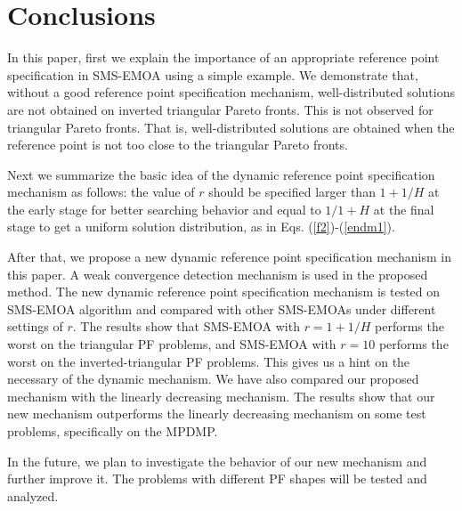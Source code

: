 \documentclass[conference]{IEEEtran}
\begin{document}
\section{Conclusions}

In this paper, first we explain the importance of an appropriate reference point specification 
in SMS-EMOA using a simple example. 
We demonstrate that, without a good reference point specification mechanism, 
well-distributed solutions are not obtained on inverted triangular Pareto fronts. 
This is not observed for triangular Pareto fronts. 
That is, well-distributed solutions are obtained when the reference point is not too close to the triangular Pareto fronts. 


Next we summarize the basic idea of the dynamic reference point specification mechanism as follows: 
the value of $r$ should be specified larger than $1+1/H$ at the early stage for better searching behavior 
and equal to $1/1+H$ at the final stage to get a uniform solution distribution, as in Eqs. (\ref{f2})-(\ref{endm1}). 

After that, we propose a new dynamic reference point specification mechanism in this paper. 
A weak convergence detection mechanism is used in the proposed method. 
The new dynamic reference point specification mechanism is tested on SMS-EMOA algorithm 
and compared with other SMS-EMOAs under different settings of $r$. 
The results show that SMS-EMOA with $r=1+1/H$ performs the worst on the triangular PF problems, 
and SMS-EMOA with $r=10$ performs the worst on the inverted-triangular PF problems. 
This gives us a hint on the necessary of the dynamic mechanism. 
We have also compared our proposed mechanism with the linearly decreasing mechanism. 
The results show that our new mechanism outperforms the linearly decreasing mechanism on some test problems, 
specifically on the MPDMP. 

In the future, we plan to investigate the behavior of our new mechanism and further improve it. 
The problems with different PF shapes will be tested and analyzed. 

 
 
\end{document}
